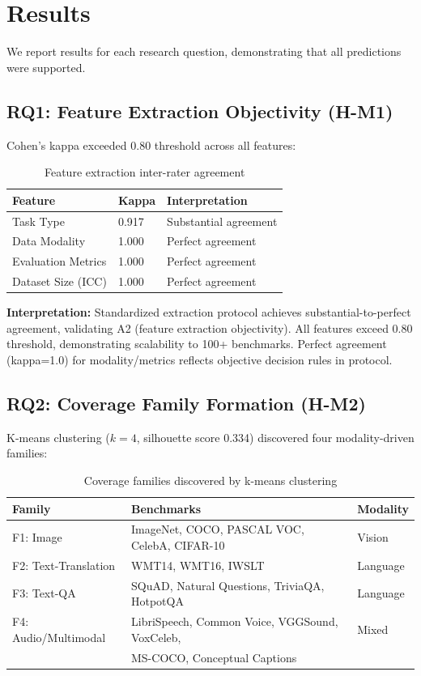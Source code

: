 \section{Results}

We report results for each research question, demonstrating that all predictions were supported.

\subsection{RQ1: Feature Extraction Objectivity (H-M1)}

Cohen's kappa exceeded 0.80 threshold across all features:

\begin{table}[h]
\centering
\caption{Feature extraction inter-rater agreement}
\label{tab:kappa}
\begin{tabular}{lll}
\toprule
Feature & Kappa & Interpretation \\
\midrule
Task Type & 0.917 & Substantial agreement \\
Data Modality & 1.000 & Perfect agreement \\
Evaluation Metrics & 1.000 & Perfect agreement \\
Dataset Size (ICC) & 1.000 & Perfect agreement \\
\bottomrule
\end{tabular}
\end{table}

\textbf{Interpretation:} Standardized extraction protocol achieves substantial-to-perfect agreement, validating A2 (feature extraction objectivity). All features exceed 0.80 threshold, demonstrating scalability to 100+ benchmarks. Perfect agreement (kappa=1.0) for modality/metrics reflects objective decision rules in protocol.

\subsection{RQ2: Coverage Family Formation (H-M2)}

K-means clustering ($k=4$, silhouette score 0.334) discovered four modality-driven families:

\begin{table}[h]
\centering
\caption{Coverage families discovered by k-means clustering}
\label{tab:families}
\begin{tabular}{lll}
\toprule
Family & Benchmarks & Modality \\
\midrule
F1: Image & ImageNet, COCO, PASCAL VOC, CelebA, CIFAR-10 & Vision \\
F2: Text-Translation & WMT14, WMT16, IWSLT & Language \\
F3: Text-QA & SQuAD, Natural Questions, TriviaQA, HotpotQA & Language \\
F4: Audio/Multimodal & LibriSpeech, Common Voice, VGGSound, VoxCeleb, & Mixed \\
                     & MS-COCO, Conceptual Captions & \\
\bottomrule
\end{tabular}
\end{table}

